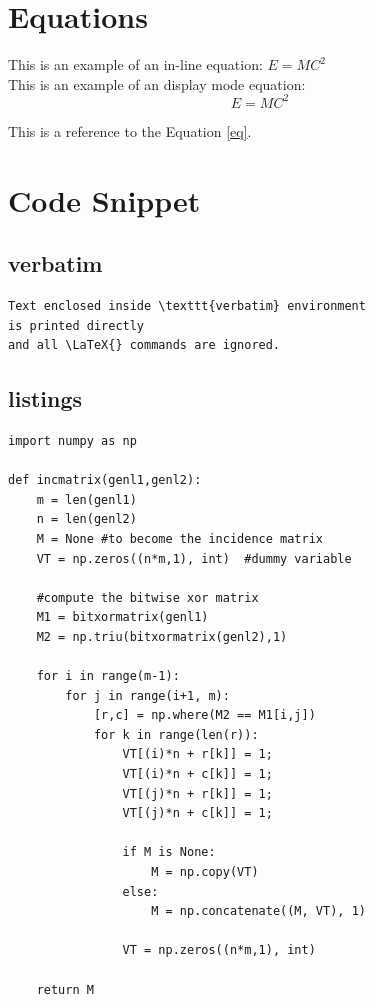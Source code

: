 \documentclass[a4paper, oneside]{book}
\begin{document}
\section{Equations}

This is an example of an in-line equation: $E = MC^2$\\
This is an example of an display mode equation:
\begin{equation}
    E = MC^2
\label{eq}
\end{equation}

This is a reference to the Equation \ref{eq}.

\section{Code Snippet}

\subsection{verbatim}
\begin{verbatim}
Text enclosed inside \texttt{verbatim} environment 
is printed directly 
and all \LaTeX{} commands are ignored.
\end{verbatim}

\subsection{listings}
\begin{lstlisting}
import numpy as np
    
def incmatrix(genl1,genl2):
    m = len(genl1)
    n = len(genl2)
    M = None #to become the incidence matrix
    VT = np.zeros((n*m,1), int)  #dummy variable
    
    #compute the bitwise xor matrix
    M1 = bitxormatrix(genl1)
    M2 = np.triu(bitxormatrix(genl2),1) 

    for i in range(m-1):
        for j in range(i+1, m):
            [r,c] = np.where(M2 == M1[i,j])
            for k in range(len(r)):
                VT[(i)*n + r[k]] = 1;
                VT[(i)*n + c[k]] = 1;
                VT[(j)*n + r[k]] = 1;
                VT[(j)*n + c[k]] = 1;
                
                if M is None:
                    M = np.copy(VT)
                else:
                    M = np.concatenate((M, VT), 1)
                
                VT = np.zeros((n*m,1), int)
    
    return M
\end{lstlisting}
\end{document}
